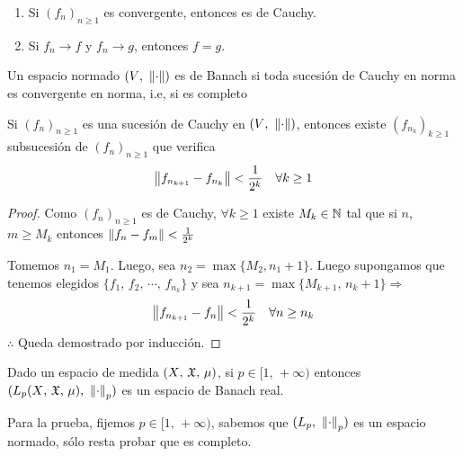 \begin{note}
    \begin{enumerate}
        \item Si \((f_n)_{n \geq 1}\) es convergente, entonces es de Cauchy.
        \item Si \(f_n \to f\) y \(f_n \to g\), entonces \(f = g\).
    \end{enumerate}
\end{note}

\begin{definition}
    Un espacio normado \((V \text{, } \left\lVert\cdot\right\rVert)\) es de Banach si toda sucesión de Cauchy en norma es convergente en norma, i.e, si es completo
\end{definition}

\begin{note}
    Si \((f_n)_{n \geq 1}\) es una sucesión de Cauchy en \((V \text{, } \left\lVert\cdot\right\rVert)\), entonces existe \((f_{n_k})_{k \geq 1}\) subsucesión de \((f_n)_{n \geq 1}\) que verifica \begin{align*}
        \left\lVert f_{n_{k+1}} - f_{n_k}\right\rVert < \frac{1}{2^k} \quad \forall k \geq 1
    \end{align*}

    \begin{proof}
        Como \((f_n)_{n \geq 1}\) es de Cauchy, \(\forall k \geq 1\) existe \(M_k \in \mathbb{N}\) tal que si \(n\), \(m \geq M_k\) entonces \(\left\lVert f_n - f_m\right\rVert < \frac{1}{2^k}\)

        Tomemos \(n_1 = M_1\). Luego, sea \(n_2 = \max\{M_2, n_1+1\}\).
        Luego supongamos que tenemos elegidos \(\{ f_1 \text{, } f_2 \text{, } \cdots \text{, } f_{n_k} \}\) y sea \(n_{k+1} = \max\{M_{k+1} \text{, } n_k + 1\} \Rightarrow\)
        \begin{align*}
            \left\lVert f_{n_{k+1}} - f_{n}\right\rVert < \frac{1}{2^k} \quad \forall n \geq n_k
        \end{align*}
        \(\therefore\) Queda demostrado por inducción.
    \end{proof}
\end{note}

\begin{theorem}
    Dado un espacio de medida \((X \text{, } \mathfrak{X} \text{, } \mu)\), si \(p \in [1 \text{, } +\infty)\) entonces \((L_p(X \text{, } \mathfrak{X}\text{, } \mu) \text{, } \left\lVert\cdot\right\rVert_p)\) es un espacio de Banach real.
\end{theorem}

Para la prueba, fijemos \(p \in [1\text{, } +\infty)\), sabemos que \((L_p \text{, } \left\lVert\cdot\right\rVert_p)\) es un espacio normado, sólo resta probar que es completo.

